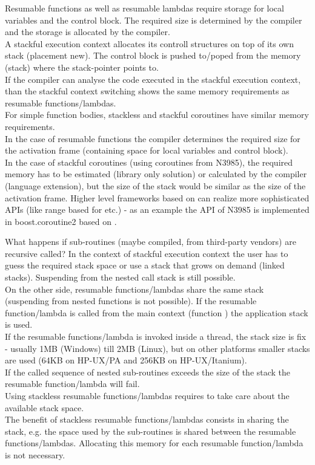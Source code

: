 Resumable functions as well as resumable lambdas require storage for local
variables and the control block. The required size is determined by the compiler
and the storage is allocated by the compiler.\\
A stackful execution context allocates its controll structures on top of its own
stack (placement new). The control block is pushed to/poped from the memory
(stack) where the stack-pointer points to.\\
If the compiler can analyse the code executed in the stackful execution context,
than the stackful context switching shows the same memory requirements as
resumable functions/lambdas.\\
\newline
For simple function bodies, stackless and stackful coroutines have similar
memory requirements.\\
In the case of resumable functions the compiler determines the required size for
the activation frame (containing space for local variables and control block).\\
In the case of stackful coroutines (using coroutines from N3985), the required
memory has to be estimated (library only solution) or calculated by the compiler
(language extension), but the size of the stack would be similar as the size
of the activation frame.
Higher level frameworks based on \ectx can realize more sophisticated APIs
(like range based for etc.) - as an example the API of N3985\cite{N3985} is
implemented in boost.coroutine2\cite{bcoroutine2} based on
.

What happens if sub-routines (maybe compiled, from third-party vendors) are
recursive called? In the context of stackful execution context
the user has to guess the required stack space or use a stack that grows on
demand (linked stacks). Suspending from the nested call stack is still
possible.\\
\newline
On the other side, resumable functions/lambdas share the same stack (suspending
from nested functions is not possible). If the resumable function/lambda is
called from the main context (function \main) the application stack is used.\\
If the resumable functions/lambda is invoked inside a thread, the stack size is
fix - usually 1MB (Windows) till 2MB (Linux), but on other platforms smaller
stacks are used (64KB on HP-UX/PA and 256KB on HP-UX/Itanium).\\
If the called sequence of nested sub-routines exceeds the size of the stack the
resumable function/lambda will fail.\\
\newline
Using stackless resumable functions/lambdas requires to take care about the
available stack space.\\
\newline
The benefit of stackless resumable functions/lambdas consists in sharing the
stack, e.g. the space used by the sub-routines is shared between the resumable
functions/lambdas. Allocating this memory for each resumable function/lambda is
not necessary.

